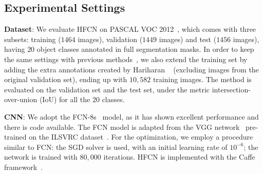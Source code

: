 \subsection{Experimental Settings}
\textbf{Dataset}: We evaluate HFCN on PASCAL VOC
2012~\citep{pascal:2011}, which comes with three subsets: training
($1464$ images), validation ($1449$ images) and test ($1456$ images),
having $20$ object classes annotated in full segmentation masks. In
order to keep the same settings with previous
methods~\citep{Long_2015_CVPR, ConsCNN, cnn:em, whatpoint}, we also
extend the training set by adding the extra annotations created by
Hariharan \etal~\citep{semantic:contour} (excluding images from the
original validation set), ending up with $10,582$ training images. The
method is evaluated on the validation set and the test set, under the
metric intersection-over-union (IoU) for all the $20$ classes.

\textbf{CNN}: We adopt the
FCN-8s~\citep{Long_2015_CVPR} model, as it has shown excellent
performance and there is code available. The FCN model is adapted from
the VGG network~\citep{vgg16} pre-trained on the ILSVRC
dataset~\citep{imageNet:challenge}. For the optimization, we employ a
procedure similar to FCN: the SGD solver is used, with an initial
learning rate of $10^{-6}$; the network is trained with $80,000$
iterations.  HFCN is implemented with the Caffe
framework~\citep{Caffe}.%


\begin{table}[tb]
\centering
{}
\caption{The results of different methods with varying levels of supervision on the validation set of PASCAL VOC 2012.}
\label{table:val} %
\end{table}


